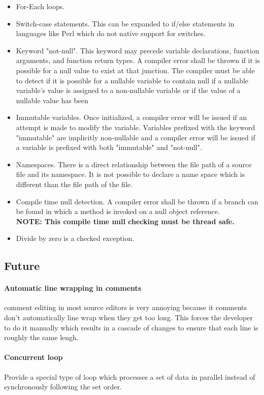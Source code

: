 \documentclass[hidelinks]{article}
\begin{document}
\begin{itemize}
\item For-Each loops.
\item Switch-case statements. This can be expanded to if/else statements in languages like Perl which do not native support for switches.
\item Keyword "not-null". This keyword may precede variable declarations, function
   arguments, and function return types. A compiler error shall be thrown if it
   is possible for a null value to exist at that junction. The compiler must be
   able to detect if it is possible for a nullable variable to contain null if
   a nullable variable's value is assigned to a non-nullable variable or if the
   value of a nullable value has been 
\item Immutable variables. Once initialized, a compiler error will be issued if an attempt is made to modify the variable. Variables prefixed with the keyword "immutable" are implicitly non-nullable and a compiler error will be issued if a variable is prefixed with both "immutable" and "not-null".
\item Namespaces. There is a direct relationship between the file path of a source file and its namespace. It is not possible to declare a name space which is different than the file path of the file.
\item Compile time null detection. A compiler error shall be thrown if a branch can be found in which a method is invoked on a null object reference.\\
\textbf{NOTE: This compile time null checking must be thread safe.} 
\item Divide by zero is a checked exception.
\end{itemize}
\subsection{Future}
\paragraph{Automatic line wrapping in comments} comment editing in most source editors is very annoying because it comments don't automatically line wrap when they get too long. This forces the developer to do it manually which results in a cascade of changes to ensure that each line is roughly the same lengh.
\paragraph{Concurrent loop} Provide a special type of loop which processes a set of data in parallel instead of synchronously following the set order.
\end{document}
